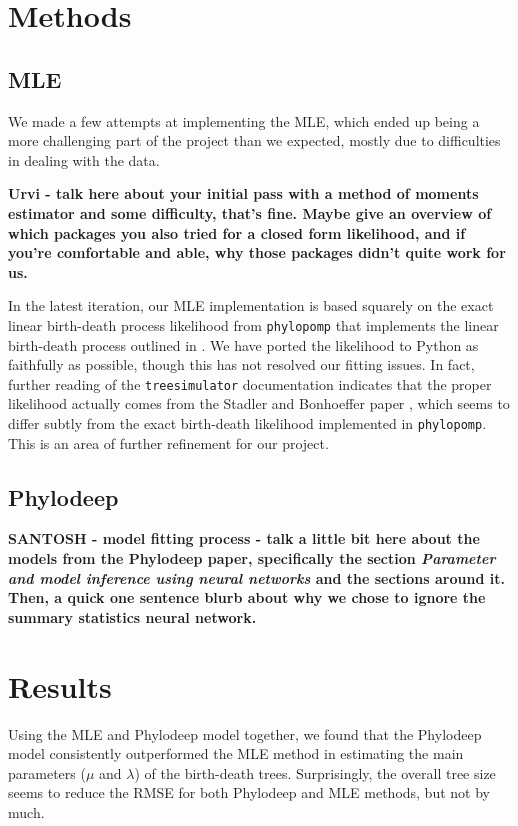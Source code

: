 \documentclass[a4paper]{article}
\def\code#1{\texttt{#1}}
\begin{document}
\section{Methods}

\subsection{MLE}

We made a few attempts at implementing the MLE, which ended up being a more challenging part of the project
than we expected, mostly due to difficulties in dealing with the data.

\textbf{Urvi - talk here about your initial pass with a method of moments estimator and some difficulty, that's fine. Maybe
give an overview of which packages you also tried for a closed form likelihood, and if you're comfortable and able, 
why those packages didn't quite work for us.}

In the latest iteration, our MLE implementation is based squarely on the exact linear birth-death process likelihood
from \code{phylopomp}\cite{king_phylopomp_2025} that implements the linear birth-death process outlined in \cite{stadler_sampling-through-time_2010}. We have ported the likelihood to Python as faithfully as possible, though this has not resolved our fitting issues. In
fact, further reading of the \code{treesimulator} documentation indicates that the proper likelihood actually comes from the Stadler and Bonhoeffer paper \cite{stadler_uncovering_2013}, which seems to differ subtly from the exact birth-death likelihood implemented in \code{phylopomp}. This is an area of further refinement for our project.

\subsection{Phylodeep}

\textbf{SANTOSH - model fitting process - talk a little bit here about the models from the Phylodeep paper, 
specifically the section \textit{Parameter and model inference using neural networks} and the sections around it. Then, 
a quick one sentence blurb about why we chose to ignore the summary statistics neural network.}

\section{Results}

Using the MLE and Phylodeep model together, we found that the Phylodeep model consistently outperformed
the MLE method in estimating the main parameters ($\mu$ and $\lambda$) of the birth-death trees. Surprisingly,
the overall tree size seems to reduce the RMSE for both Phylodeep and MLE methods, but 
not by much.
\end{document}
